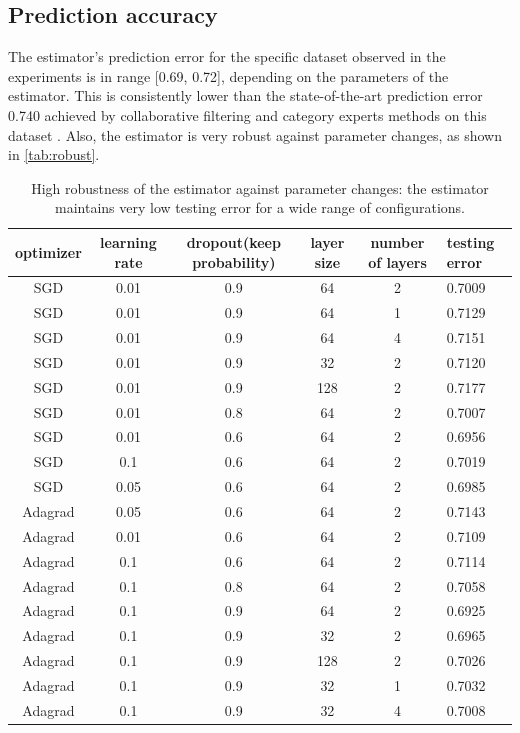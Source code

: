 \documentclass{article}
\begin{document}
\subsection{Prediction accuracy}
The estimator's prediction error for the specific dataset observed in the 
experiments is in range [0.69, 0.72], depending on the parameters of the 
estimator.
This is consistently lower than the state-of-the-art prediction error 0.740 
achieved by collaborative filtering and category experts methods on this 
dataset \cite{hwang2016efficient}.
Also, the estimator is very robust against parameter changes, as shown in 
\autoref{tab:robust}.
\begin{table}[h]
	\centering
	\begin{tabularx}{\textwidth}{ |c|c|c|c|c|X| } \hline
		optimizer  & learning rate & dropout(keep probability) & layer size & 
		number of layers & 
		testing error \\ \hline
		SGD & 0.01 & 0.9 & 64 & 2 & 0.7009 \\ \hline
		SGD & 0.01 & 0.9 & 64 & 1 & 0.7129 \\ \hline
		SGD & 0.01 & 0.9 & 64 & 4 & 0.7151 \\ \hline
		SGD & 0.01 & 0.9 & 32 & 2 & 0.7120 \\ \hline
		SGD & 0.01 & 0.9 & 128 & 2 & 0.7177 \\ \hline
		SGD & 0.01 & 0.8 & 64 & 2 & 0.7007 \\ \hline
		SGD & 0.01 & 0.6 & 64 & 2 & 0.6956 \\ \hline
		SGD & 0.1 & 0.6 & 64 & 2 & 0.7019 \\ \hline
		SGD & 0.05 & 0.6 & 64 & 2 & 0.6985 \\ \hline
		Adagrad & 0.05 & 0.6 & 64 & 2 & 0.7143 \\ \hline
		Adagrad & 0.01 & 0.6 & 64 & 2 & 0.7109 \\ \hline
		Adagrad & 0.1 & 0.6 & 64 & 2 & 0.7114 \\ \hline
		Adagrad & 0.1 & 0.8 & 64 & 2 & 0.7058 \\ \hline
		Adagrad & 0.1 & 0.9 & 64 & 2 & 0.6925 \\ \hline
		Adagrad & 0.1 & 0.9 & 32 & 2 & 0.6965 \\ \hline
		Adagrad & 0.1 & 0.9 & 128 & 2 & 0.7026 \\ \hline
		Adagrad & 0.1 & 0.9 & 32 & 1 & 0.7032 \\ \hline
		Adagrad & 0.1 & 0.9 & 32 & 4 & 0.7008 \\ \hline
	\end{tabularx}
	\caption{High robustness of the estimator against parameter changes: 
	the estimator maintains very low testing error for a wide range of 
	configurations.}
	\label{tab:robust}
\end{table}
\end{document}
